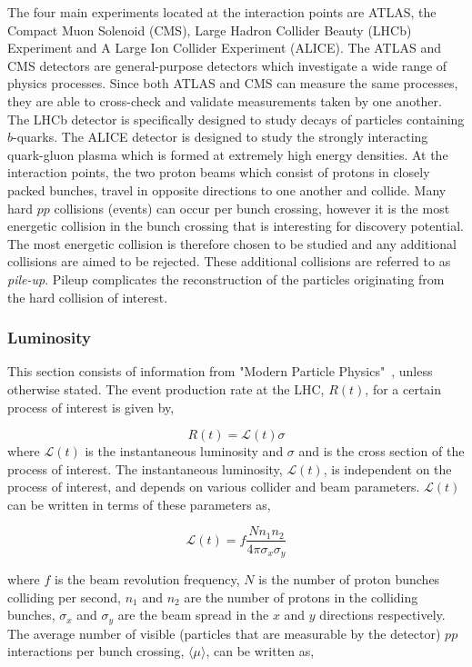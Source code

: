 The four main experiments located at the interaction points are ATLAS, the Compact Muon Solenoid (CMS), Large Hadron Collider Beauty (LHCb) Experiment and A Large Ion Collider Experiment (ALICE). The ATLAS and CMS detectors are general-purpose detectors which investigate a wide range of physics processes. Since both ATLAS and CMS can measure the same processes, they are able to cross-check and validate measurements taken by one another. The LHCb detector is specifically designed to study decays of particles containing $b$-quarks. The ALICE detector is designed to study the strongly interacting quark-gluon plasma which is formed at extremely high energy densities. At the interaction points, the two proton beams which consist of protons in closely packed bunches, travel in opposite directions to one another and collide. Many hard $pp$ collisions (events) can occur per bunch crossing, however it is the most energetic collision in the bunch crossing that is interesting for discovery potential. The most energetic collision is therefore chosen to be studied and any additional collisions are aimed to be rejected. These additional collisions are referred to as \textit{pile-up}. Pileup complicates the reconstruction of the particles originating from the hard collision of interest. 

\subsubsection{Luminosity}
This section consists of information from "Modern Particle Physics"~\cite{thomson2013modern}, unless otherwise stated. The event production rate at the LHC, $R(t)$, for a certain process of interest is given by, 

\begin{equation}
R(t) = \mathcal{L}(t)\sigma
\end{equation}
where $\mathcal{L}(t)$ is the instantaneous luminosity and $\sigma$ and is the cross section of the process of interest. The instantaneous luminosity, $\mathcal{L}(t)$, is independent on the process of interest, and depends on various collider and beam parameters. $\mathcal{L}(t)$ can be written in terms of these parameters as,

\begin{equation}
\mathcal{L}(t) = f \frac{N n_{1} n_{2}}{4\pi \sigma_{x} \sigma_{y}}
\end{equation}

where $f$ is the beam revolution frequency, $N$ is the number of proton bunches colliding per second, $n_{1}$ and $n_{2}$ are the number of protons in the colliding bunches, $\sigma_{x}$ and $\sigma_{y}$ are the beam spread in the $x$ and $y$ directions respectively. The average number of visible (particles that are measurable by the detector) $pp$ interactions per bunch crossing, $\langle \mu \rangle$, can be written as,

